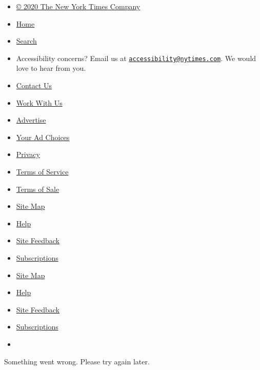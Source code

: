 \begin{itemize}
\tightlist
\item
  \href{https://help.nytimes.com/hc/en-us/articles/115014792127-Copyright-notice}{©
  2020 The New York Times Company}
\item
  \href{https://www.nytimes.com}{Home}
\item
  \href{http://query.nytimes.com/search/sitesearch/\#/}{Search}
\item
  Accessibility concerns? Email us at
  \href{mailto:accessibility@nytimes.com}{\nolinkurl{accessibility@nytimes.com}}.
  We would love to hear from you.
\item
  \href{https://www.nytimes.com/ref/membercenter/help/infoservdirectory.html}{Contact
  Us}
\item
  \href{http://www.nytco.com/careers}{Work With Us}
\item
  \href{http://nytmediakit.com/}{Advertise}
\item
  \href{https://www.nytimes.com/content/help/rights/privacy/policy/privacy-policy.html\#pp}{Your
  Ad Choices}
\item
  \href{https://www.nytimes.com/privacy}{Privacy}
\item
  \href{https://help.nytimes.com/hc/en-us/articles/115014893428-Terms-of-service}{Terms
  of Service}
\item
  \href{https://help.nytimes.com/hc/en-us/articles/115014893968-Terms-of-sale}{Terms
  of Sale}
\item
  \href{http://spiderbites.nytimes.com}{Site Map}
\item
  \href{https://help.nytimes.com/hc/en-us}{Help}
\item
  \href{https://help.nytimes.com/hc/en-us/articles/115015385887-Contact-us}{Site
  Feedback}
\item
  \href{https://www.nytimes.com/subscriptions/Multiproduct/lp5558.html?campaignId=37WXW}{Subscriptions}
\end{itemize}

\begin{itemize}
\item
  \href{http://spiderbites.nytimes.com}{Site Map}
\item
  \href{https://help.nytimes.com/hc/en-us}{Help}
\item
  \href{https://help.nytimes.com/hc/en-us/articles/115015385887-Contact-us}{Site
  Feedback}
\item
  \href{https://www.nytimes.com/subscriptions/Multiproduct/lp5558.html?campaignId=37WXW}{Subscriptions}
\item
\end{itemize}

Something went wrong. Please try again later.
